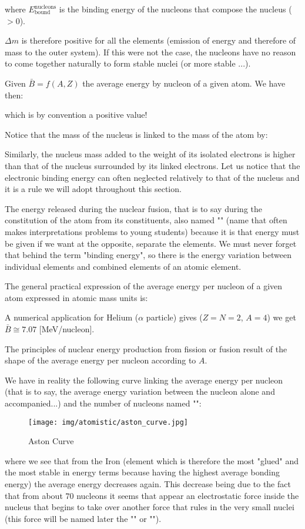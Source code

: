 	where $E_\text{bound}^\text{nucleons}$ is the binding energy of the nucleons that compose the nucleus ($> 0$).
	
	$\Delta m$ is therefore positive for all the elements (emission of energy and therefore of mass to the outer system). If this were not the case, the nucleons have no reason to come together naturally to form stable nuclei (or more stable ...).
	
	Given $\bar{B}=f(A,Z)$ the average energy by nucleon of a given atom. We have then:
	
	which is by convention a positive value!

	Notice that the mass of the nucleus is linked to the mass of the atom by:
	
	Similarly, the nucleus mass added to the weight of its isolated electrons is higher than that of the nucleus surrounded by its linked electrons. Let us notice that the electronic binding energy can often neglected relatively to that of the nucleus and it is a rule we will adopt throughout this section.

	The energy released during the nuclear fusion, that is to say during the constitution of the atom from its constituents, also named "" (name that often makes  interpretations problems to young students) because it is that energy must be given if we want at the opposite, separate the elements. We must never forget that behind the term "binding energy", so there is the energy variation between individual elements and combined elements of an atomic element.
	
	The general practical expression of the average energy per nucleon of a given atom expressed in atomic mass units is:
	
	A numerical application for Helium ($\alpha$ particle) gives ($Z=N=2$, $A=4$) we get $\bar{B}\cong 7.07$ [MeV/nucleon].
	
	The principles of nuclear energy production from fission or fusion result of the shape of the average energy per nucleon according to $A$.

	We have in reality the following curve linking the average energy per nucleon (that is to say, the average energy variation between the nucleon alone and accompanied...) and the number of nucleons named "":
	\begin{figure}[H]
		\centering
		\texttt{[image: img/atomistic/aston\_curve.jpg]}
		\caption{Aston Curve}
	\end{figure}
	where we see that from the Iron (element which is therefore the most "glued" and the most stable in energy terms because having the highest average bonding energy) the average energy decreases again. This decrease being due to the fact that from about $70$ nucleons it seems that appear an electrostatic force inside the nucleus that begins to take over another force that rules in the very small nuclei (this force will be named later the "" or "").


